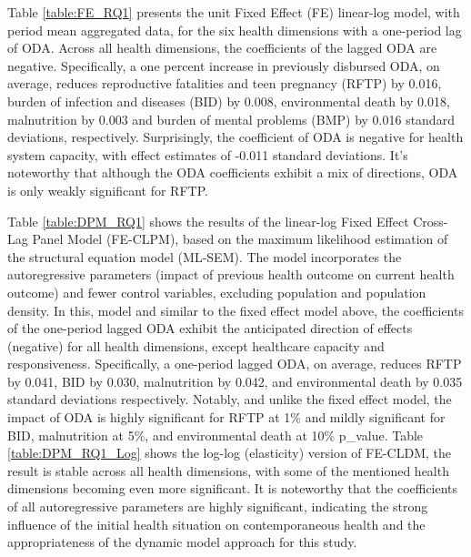 Table \ref{table:FE_RQ1} presents the unit Fixed Effect (FE) linear-log model, with period mean aggregated data, for the six health dimensions with a one-period lag of ODA. Across all health dimensions, the coefficients of the lagged ODA are negative. Specifically, a one percent increase in previously disbursed ODA, on average, reduces reproductive fatalities and teen pregnancy (RFTP) by 0.016, burden of infection and diseases (BID) by 0.008, environmental death by 0.018, malnutrition by 0.003 and burden of mental problems (BMP) by 0.016 standard deviations, respectively. Surprisingly, the coefficient of ODA is negative for health system capacity, with effect estimates of -0.011 standard deviations. It's noteworthy that although the ODA coefficients exhibit a mix of directions, ODA is only weakly significant for RFTP.


Table \ref{table:DPM_RQ1} shows the results of the linear-log Fixed Effect Cross-Lag Panel Model (FE-CLPM), based on the maximum likelihood estimation of the structural equation model (ML-SEM). The model incorporates the autoregressive parameters (impact of previous health outcome on current health outcome) and fewer control variables, excluding population and population density. In this, model and similar to the fixed effect model above, the coefficients of the one-period lagged ODA exhibit the anticipated direction of effects (negative) for all health dimensions, except healthcare capacity and responsiveness. Specifically, a one-period lagged ODA, on average, reduces RFTP by 0.041, BID by 0.030, malnutrition by 0.042, and environmental death by 0.035 standard deviations respectively. Notably, and unlike the fixed effect model, the impact of ODA is highly significant for RFTP at 1\% and mildly significant for BID, malnutrition at 5\%, and environmental death at 10\% p\_value. Table \ref{table:DPM_RQ1_Log} shows the log-log (elasticity) version of FE-CLDM, the result is stable across all health dimensions, with some of the mentioned health dimensions becoming even more significant. It is noteworthy that the coefficients of all autoregressive parameters are highly significant, indicating the strong influence of the initial health situation on contemporaneous health and the appropriateness of the dynamic model approach for this study. 


